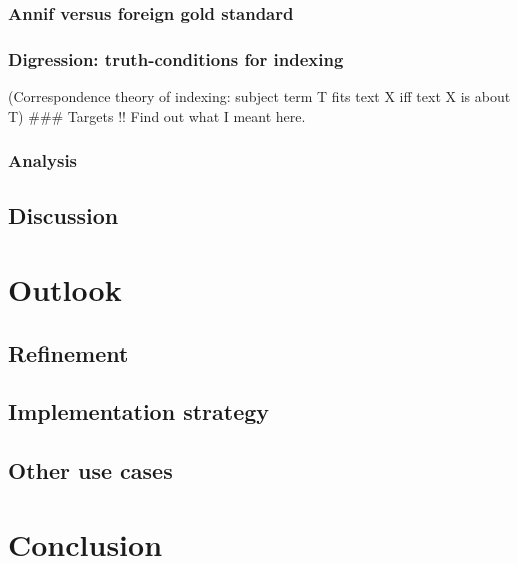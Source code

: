 \hypertarget{annif-versus-foreign-gold-standard}{%
\subsubsection{Annif versus foreign gold
standard}\label{annif-versus-foreign-gold-standard}}

\hypertarget{digression-truth-conditions-for-indexing}{%
\subsubsection{Digression: truth-conditions for
indexing}\label{digression-truth-conditions-for-indexing}}

(Correspondence theory of indexing: subject term T fits text X iff text
X is about T) \#\#\# Targets !! Find out what I meant here.

\hypertarget{analysis-2}{%
\subsubsection{Analysis}\label{analysis-2}}

\hypertarget{discussion}{%
\subsection{Discussion}\label{discussion}}

\hypertarget{outlook}{%
\section{Outlook}\label{outlook}}

\hypertarget{refinement}{%
\subsection{Refinement}\label{refinement}}

\hypertarget{implementation-strategy}{%
\subsection{Implementation strategy}\label{implementation-strategy}}

\hypertarget{other-use-cases}{%
\subsection{Other use cases}\label{other-use-cases}}

\hypertarget{conclusion}{%
\section{Conclusion}\label{conclusion}}

